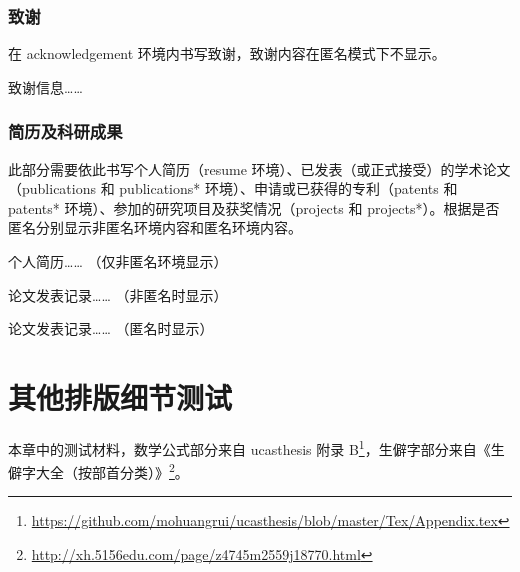 \documentclass[doctor]{shtthesis}
\begin{document}
\subsection{致谢}
在 acknowledgement 环境内书写致谢，致谢内容在匿名模式下不显示。
\begin{latex}
\begin{acknowledgement}
  致谢信息……
\end{acknowledgement}
\end{latex}

\subsection{简历及科研成果}
此部分需要依此书写个人简历（resume 环境）、已发表（或正式接受）的学术论文（publications 和 publications* 环境）、申请或已获得的专利（patents 和 patents* 环境）、参加的研究项目及获奖情况（projects 和 projects*）。根据是否匿名分别显示非匿名环境内容和匿名环境内容。
\begin{latex}
\begin{resume}
  个人简历…… （仅非匿名环境显示）
\end{resume}

\begin{publications}
  论文发表记录…… （非匿名时显示）
\end{publications}

\begin{publications*}
  论文发表记录…… （匿名时显示）
\end{publications*}
\end{latex}

\makebiblio

\appendix
\chapter{其他排版细节测试}
本章中的测试材料，数学公式部分来自 \textsf{ucasthesis} 附录 B\footnote{\url{https://github.com/mohuangrui/ucasthesis/blob/master/Tex/Appendix.tex}}，生僻字部分来自《生僻字大全（按部首分类）》\footnote{\url{http://xh.5156edu.com/page/z4745m2559j18770.html}}。
\end{document}
